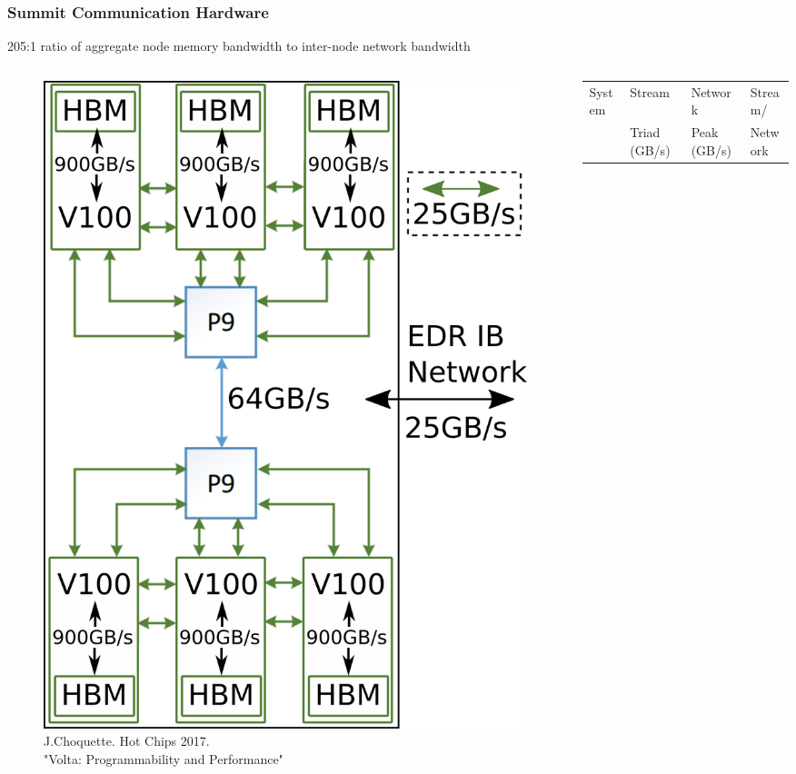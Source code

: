 \documentclass[aspectratio=169]{beamer}
\begin{document}
\begin{frame}
  \frametitle{Summit Communication Hardware}
  205:1 ratio of aggregate node memory bandwidth to inter-node network bandwidth
    \begin{columns}
      \begin{column}{0.3\textwidth}
        \begin{figure}
          \centering
          \includegraphics[width=.9\textwidth]{figures/summit-node.png}\\
          \tiny{J.Choquette. Hot Chips 2017. \\"Volta: Programmability and Performance"}
        \end{figure}
      \end{column}
    \begin{column}{0.7\textwidth}
      \small {
      \begin{table}[]
        \begin{tabular}{llll}
          System              & Stream       & Network     & Stream/ \\
                              & Triad (GB/s) & Peak (GB/s) & Network \\

\end{tabular}
\end{table}}
\end{column}
\end{columns}
\end{frame}
\end{document}
